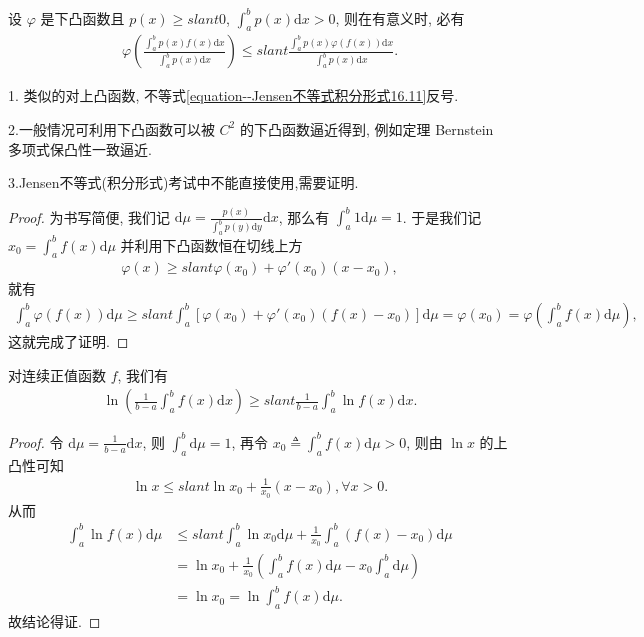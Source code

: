 \documentclass[../../main.tex]{subfiles}
\begin{document}
\begin{theorem}\label{theorem:Jensen不等式积分形式}
设 $\varphi$ 是下凸函数且 $p(x) \geqslant slant 0$, $\int_a^b p(x) \mathrm{d}x > 0$, 则在有意义时, 必有
\begin{align}\label{equation--Jensen不等式积分形式16.11}
\varphi\left(\frac{\int_a^b p(x)f(x)\mathrm{d}x}{\int_a^b p(x)\mathrm{d}x}\right) \leqslant slant \frac{\int_a^b p(x)\varphi(f(x))\mathrm{d}x}{\int_a^b p(x)\mathrm{d}x}.
\end{align}
\end{theorem}
\begin{note}
1. 类似的对上凸函数, 不等式\eqref{equation--Jensen不等式积分形式16.11}反号.

2.一般情况可利用下凸函数可以被 $C^2$ 的下凸函数逼近得到, 例如定理 Bernstein 多项式保凸性一致逼近. 

3.Jensen不等式(积分形式)考试中不能直接使用,需要证明.
\end{note}
\begin{proof}
为书写简便, 我们记 $\mathrm{d}\mu = \frac{p(x)}{\int_a^b p(y)\mathrm{d}y}\mathrm{d}x$, 那么有 $\int_a^b 1\mathrm{d}\mu = 1$. 于是我们记 $x_0 = \int_a^b f(x)\mathrm{d}\mu$ 并利用下凸函数恒在切线上方
\begin{align*}
\varphi(x) \geqslant slant \varphi(x_0) + \varphi'(x_0)(x - x_0),
\end{align*}
就有
\begin{align*}
\int_a^b \varphi(f(x))\mathrm{d}\mu \geqslant slant \int_a^b [\varphi(x_0) + \varphi'(x_0)(f(x) - x_0)]\mathrm{d}\mu = \varphi(x_0) = \varphi\left(\int_a^b f(x)\mathrm{d}\mu\right),
\end{align*}
这就完成了证明. 
\end{proof}

\begin{example}
对连续正值函数 $f$, 我们有
\begin{align*}
\ln\left(\frac{1}{b - a}\int_a^b f(x)\mathrm{d}x\right) \geqslant slant \frac{1}{b - a}\int_a^b \ln f(x)\mathrm{d}x.
\end{align*} 
\end{example}
\begin{proof}
令 $\mathrm{d}\mu = \frac{1}{b - a}\mathrm{d}x$, 则 $\int_a^b \mathrm{d}\mu = 1$, 再令 $x_0 \triangleq \int_a^b f(x) \mathrm{d}\mu>0$, 则由 $\ln x$ 的上凸性可知
\begin{align*}
\ln x \leqslant slant \ln x_0 + \frac{1}{x_0}(x - x_0), \forall x > 0.
\end{align*}
从而
\begin{align*}
\int_a^b \ln f(x) \mathrm{d}\mu &\leqslant slant \int_a^b \ln x_0 \mathrm{d}\mu + \frac{1}{x_0}\int_a^b (f(x) - x_0) \mathrm{d}\mu \\
&= \ln x_0 + \frac{1}{x_0}\left(\int_a^b f(x) \mathrm{d}\mu - x_0\int_a^b \mathrm{d}\mu\right) \\
&= \ln x_0 = \ln \int_a^b f(x) \mathrm{d}\mu.
\end{align*}
故结论得证.
\end{proof}
\end{document}
